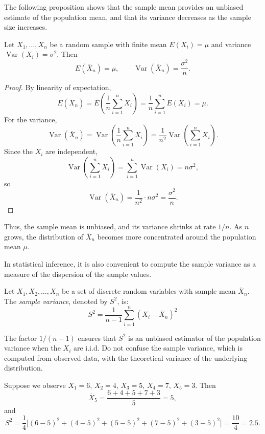 The following proposition shows that the sample mean provides an unbiased estimate of the population mean, and that its variance decreases as the sample size increases.

\begin{proposition}\label{prop:sample_mean}
Let \( X_1, \ldots, X_n \) be a random sample with finite mean \( E(X_i) = \mu \) and variance \( \operatorname{Var}(X_i) = \sigma^2 \). Then
\[
E(\bar{X}_n) = \mu, \qquad \operatorname{Var}(\bar{X}_n) = \frac{\sigma^2}{n}.
\]
\end{proposition}
\begin{proof}
By linearity of expectation,
\[
E(\bar{X}_n) = E\!\left( \frac{1}{n} \sum_{i=1}^{n} X_i \right) = \frac{1}{n} \sum_{i=1}^{n} E(X_i) = \mu.
\]
For the variance,
\[
\operatorname{Var}(\bar{X}_n) = \operatorname{Var}\!\left( \frac{1}{n} \sum_{i=1}^{n} X_i \right) = \frac{1}{n^2} \operatorname{Var}\!\left( \sum_{i=1}^{n} X_i \right).
\]
Since the \( X_i \) are independent,
\[
\operatorname{Var}\!\left( \sum_{i=1}^{n} X_i \right) = \sum_{i=1}^{n} \operatorname{Var}(X_i) = n\sigma^2,
\]
so
\[
\operatorname{Var}(\bar{X}_n) = \frac{1}{n^2} \cdot n\sigma^2 = \frac{\sigma^2}{n}.
\]
\end{proof}

Thus, the sample mean is unbiased, and its variance shrinks at rate $1/n$. As $n$ grows, the distribution of $\bar{X}_n$ becomes more concentrated around the population mean $\mu$. 

In statistical inference, it is also convenient to compute the sample variance as a measure of the dispersion of the sample values.

\begin{definition}
Let \( X_1, X_2, \ldots, X_n \) be a set of discrete random variables with sample mean \( \bar{X}_n \). The \emph{sample variance}, denoted by \( S^2 \), is:
\[
S^2 = \frac{1}{n - 1} \sum_{i=1}^n ( X_i - \bar{X}_n )^2
\]
\end{definition}

The factor $1/(n-1)$ ensures that $S^2$ is an unbiased estimator of the population variance when the $X_i$ are i.i.d. Do not confuse the sample variance, which is computed from observed data, with the theoretical variance of the underlying distribution.

\begin{example}
Suppose we observe $X_1=6, \, X_2=4, \, X_3=5, \, X_4=7, \, X_5=3 $. Then
\[
\bar{X}_5 = \frac{6+4+5+7+3}{5} = 5,
\]
and
\[
S^2 = \frac{1}{4}\big[(6-5)^2 + (4-5)^2 + (5-5)^2 + (7-5)^2 + (3-5)^2\big] = \frac{10}{4} = 2.5.
\]
\end{example}


